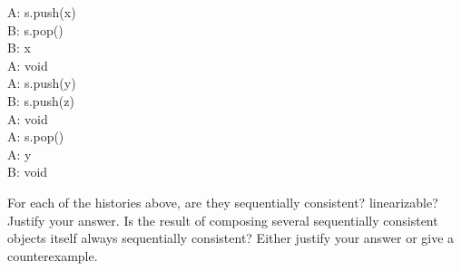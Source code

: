 \documentclass[main]{subfiles}
\begin{document}
\begin{ExerciseList}
\begin{multicols*}{3}
{                        A: s.push(x) \\
                        B: s.pop() \\
                        B: x \\
                        A: void \\
                        A: s.push(y) \\
                        B: s.push(z) \\
                        A: void \\
                        A: s.pop() \\
                        A: y \\
                        B: void
                    }
                \end{multicols*}
                \vspace{-10pt}
        \Question For each of the histories above, are they sequentially consistent? linearizable? Justify your answer.
        \Question Is the result of composing several sequentially consistent objects itself always sequentially consistent? Either justify your answer or give a counterexample.
        

\end{ExerciseList}
\end{document}
